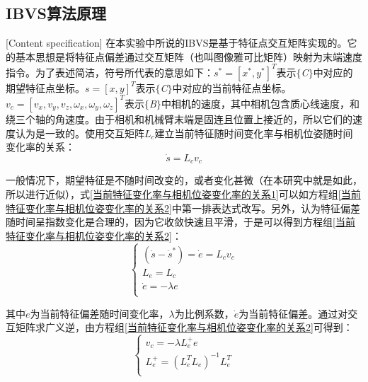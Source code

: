 \documentclass[fontset=fandol,type=bachelor,campus=harbin]{hithesisbook}
\begin{document}
\subsection{IBVS算法原理}[Content specification]
在本实验中所说的IBVS是基于特征点交互矩阵实现的\cite{chaumette2006visual}。它的基本思想是将特征点偏差通过交互矩阵（也叫图像雅可比矩阵）映射为末端速度指令。为了表述简洁，符号所代表的意思如下：$s^*=\left[ x^*,y^* \right] ^T$表示$\lbrace$\textit{C}$\rbrace$中对应的期望特征点坐标。$s=\left[ x,y \right] ^T$表示$\lbrace$\textit{C}$\rbrace$中对应的当前特征点坐标。$v_c=\left[ v_x,v_y,v_z,\omega _x,\omega _y,\omega _z \right] ^T$表示$\lbrace$\textit{B}$\rbrace$中相机的速度，其中相机包含质心线速度，和绕三个轴的角速度。由于相机和机械臂末端是固连且位置上接近的，所以它们的速度认为是一致的。使用交互矩阵$L_c$建立当前特征随时间变化率与相机位姿随时间变化率的关系：
\begin{equation}
\dot{s}=L_cv_c 
\label{当前特征变化率与相机位姿变化率的关系1} 
\end{equation} 


一般情况下，期望特征是不随时间改变的，或者变化甚微（在本研究中就是如此，所以进行近似），式\ref{当前特征变化率与相机位姿变化率的关系1}可以如方程组\ref{当前特征变化率与相机位姿变化率的关系2}中第一排表达式改写。另外，认为特征偏差随时间呈指数变化是合理的，因为它收敛快速且平滑\cite{chaumette2006visual}，于是可以得到方程组\ref{当前特征变化率与相机位姿变化率的关系2}：
\begin{equation}
\left\{ \begin{array}{c}
	\left( \dot{s}-\dot{s}^* \right) =\dot{e}=L_cv_c\\
	L_e=L_c\\
	\dot{e}=-\lambda e\\
\end{array} \right.  
\label{当前特征变化率与相机位姿变化率的关系2} 
\end{equation} 


其中$\dot{e}$为当前特征偏差随时间变化率，$\lambda$为比例系数，$\dot{e}$为当前特征偏差。通过对交互矩阵求广义逆，由方程组\ref{当前特征变化率与相机位姿变化率的关系2}可得到：
\begin{equation}
\left\{ \begin{array}{c}
	v_c=-\lambda L_{e}^{+}e\\
	L_{e}^{+}=\left( L_{e}^{T}L_e \right) ^{-1}L_{e}^{T}\\
\end{array} \right. 
\label{当前特征变化率与相机位姿变化率的关系3} 
\end{equation} 
\end{document}

